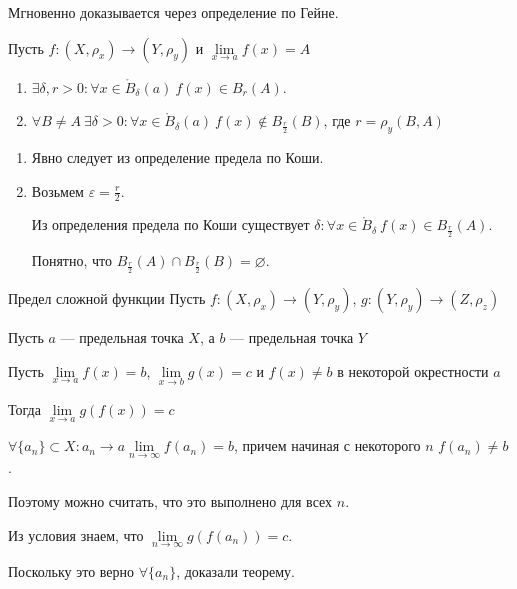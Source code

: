 Мгновенно доказывается через определение по Гейне.

\begin{thrm}{}{}
    Пусть \( f : (X, \rho_x) \to (Y, \rho_y) \) и \( \lim\limits_{x \to a} f(x) = A \)

    \begin{enumerate}
        \item
            \( \exists \delta, r > 0 : \forall x \in \mathring{B}_\delta(a) \: f(x) \in B_r(A) \).
        \item
            \( \forall B \neq A \: \exists \delta > 0 : \forall x \in \mathring{B}_\delta(a) \: f(x) \notin B_{\frac{r}{2}}(B) \),
            где \( r = \rho_y(B, A) \)
    \end{enumerate}
\end{thrm}

\begin{enumerate}
    \item
        Явно следует из определение предела по Коши.
    \item
        Возьмем \( \varepsilon = \frac{r}{2} \).

        Из определения предела по Коши существует \( \delta : \forall x \in \mathring{B}_{\delta} \ f(x) \in B_{\frac{r}{2}} (A) \).

        Понятно, что \( B_{\frac{r}{2}} (A) \cap B_{\frac{r}{2}} (B) = \varnothing \).
\end{enumerate}

\begin{thrm}{Предел сложной функции}{}
    Пусть \( f : (X, \rho_x) \to (Y, \rho_y) \), \( g : (Y, \rho_y) \to (Z, \rho_z) \)

    Пусть \( a \) --- предельная точка \( X \), а \( b \) --- предельная точка \( Y \)

    Пусть \( \lim\limits_{x \to a} f(x) = b \), \( \lim\limits_{x \to b} g(x) = c \)
    и \( f(x) \neq b \) в некоторой окрестности \( a \)

    Тогда \( \lim\limits_{x \to a} g(f(x)) = c \)
\end{thrm}

\( \forall \{ a_n \} \subset X : a_n \to a \lim\limits_{n \to \infty} f(a_n) = b \),
причем начиная с некоторого \( n \) \( f(a_n) \neq b \).

Поэтому можно считать, что это выполнено для всех \( n \).

Из условия знаем, что \( \lim\limits_{n \to \infty} g(f(a_n)) = c \).

Поскольку это верно \( \forall \{ a_n \} \),
доказали теорему.

